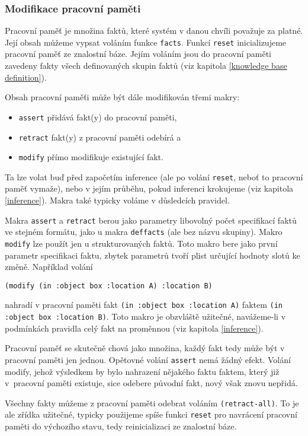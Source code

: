 \subsubsection{Modifikace pracovní paměti}
\label{modifikace}

Pracovní paměť je množina faktů, které systém v danou chvíli považuje za platné.
Její obsah můžeme vypsat voláním funkce \verb|facts|. Funkcí \verb|reset|
inicializujeme pracovní paměť ze znalostní báze. Jejím voláním jsou do pracovní
paměti zavedeny fakty všech definovaných skupin faktů (viz kapitola
\ref{knowledge base definition}).

Obsah pracovní paměťi může být dále modifikován třemi makry:
\begin{itemize}
  \item \verb|assert| přidává fakt(y) do pracovní paměti,
  \item \verb|retract| fakt(y) z pracovní paměti odebírá a
  \item \verb|modify| přímo modifikuje existující fakt.
\end{itemize}
Ta lze volat buď před započetím inference (ale po volání \verb|reset|, neboť to
pracovní paměť vymaže), nebo v jejím průběhu, pokud inferenci krokujeme (viz
kapitola \ref{inference}). Makra také typicky voláme v důsledcích pravidel.

Makra \verb|assert| a \verb|retract| berou jako parametry libovolný počet
specifikací faktů ve stejném formátu, jako u makra \verb|deffacts| (ale bez
názvu skupiny). Makro \verb|modify| lze použít jen u strukturovaných faktů. Toto
makro bere jako první parametr specifikaci faktu, zbytek parametrů tvoří plist
určující hodnoty slotů ke změně. Například volání
\begin{verbatim}
(modify (in :object box :location A) :location B)
\end{verbatim}
nahradí v pracovní paměti fakt \verb|(in :object box :location A)| faktem
\verb|(in :object box :location B)|.
Toto makro je obzvláště užitečné, navážeme-li v podmínkách pravidla celý fakt na
proměnnou (viz kapitola \ref{inference}).

Pracovní paměť se skutečně chová jako množina, každý fakt tedy může být v
pracovní paměti jen jednou. Opětovné volání \verb|assert| nemá žádný efekt.
Volání modify, jehož výsledkem by bylo nahrazení nějakého faktu faktem, který
již v~pracovní paměti existuje, sice odebere původní fakt, nový však znovu
nepřidá.

Všechny fakty můžeme z pracovní paměti odebrat voláním \verb|(retract-all)|. To
je ale zřídka užitečné, typicky použijeme spíše funkci \verb|reset| pro
navrácení pracovní paměti do výchozího stavu, tedy reinicializaci ze znalostní
báze.
